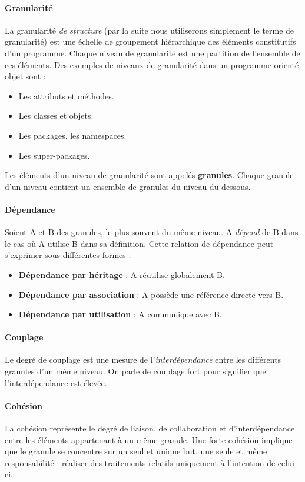 \documentclass{scrartcl}
\begin{document}
    \paragraph{Granularité}La granularité \emph{de structure} (par la suite nous utiliserons simplement le terme de granularité) est une échelle de groupement hiérarchique des éléments constitutifs d'un programme. Chaque niveau de granularité est une partition de l'ensemble de ces éléments. Des exemples de niveaux de granularité dans un programme orienté objet sont :
    \begin{itemize}
        \item Les attributs et méthodes.
        \item Les classes et objets.
        \item Les packages, les namespaces.
        \item Les super-packages.
    \end{itemize}
    Les éléments d'un niveau de granularité sont appelés \textbf{granules}. Chaque granule d'un niveau contient un ensemble de granules du niveau du dessous.
    
    \paragraph{Dépendance}Soient A et B des granules, le plus souvent du même niveau. A \emph{dépend} de B dans le cas où A utilise B dans sa définition. Cette relation de dépendance peut s'exprimer sous différentes formes :
    \begin{itemize}
        \item \textbf{Dépendance par héritage} : A réutilise globalement B.
        \item \textbf{Dépendance par association} : A possède une référence directe vers B.
        \item \textbf{Dépendance par utilisation} : A communique avec B.
    \end{itemize}

    \paragraph{Couplage}Le degré de couplage est une mesure de l'\emph{interdépendance} entre les différents granules d'un même niveau. On parle de couplage fort pour signifier que l'interdépendance est élevée.

    \paragraph{Cohésion}La cohésion représente le degré de liaison, de collaboration et d'interdépendance entre les éléments appartenant à un même granule. Une forte cohésion implique que le granule se concentre sur un seul et unique but, une seule et même responsabilité : réaliser des traitements relatifs uniquement à l’intention de celui-ci.
    
\end{document}
